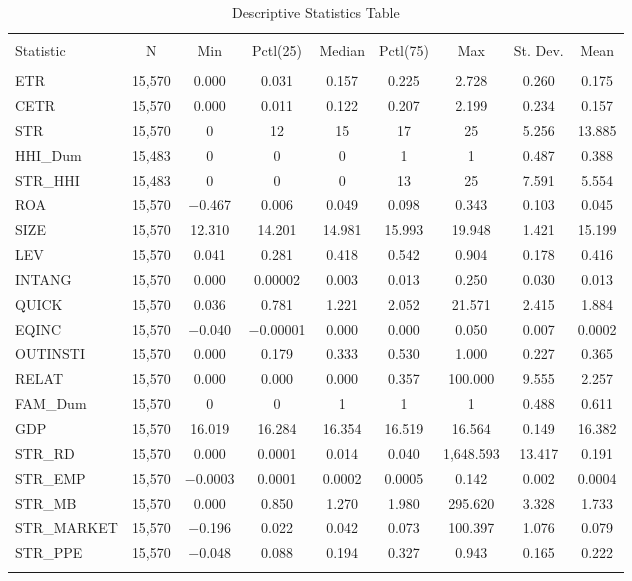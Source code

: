\documentclass[a4paper]{article}\usepackage[]{graphicx}\usepackage[]{color}
\begin{document}
\begin{table}[h!] \centering 
  \caption{Descriptive Statistics Table} 
  \label{D1} 
\begin{tabular}{@{\extracolsep{5pt}}lcccccccc} 
\\[-1.8ex]\hline 
\hline \\[-1.8ex] 
Statistic & \multicolumn{1}{c}{N} & \multicolumn{1}{c}{Min} & \multicolumn{1}{c}{Pctl(25)} & \multicolumn{1}{c}{Median} & \multicolumn{1}{c}{Pctl(75)} & \multicolumn{1}{c}{Max} & \multicolumn{1}{c}{St. Dev.} & \multicolumn{1}{c}{Mean} \\ 
\hline \\[-1.8ex] 
ETR & 15,570 & 0.000 & 0.031 & 0.157 & 0.225 & 2.728 & 0.260 & 0.175 \\ 
CETR & 15,570 & 0.000 & 0.011 & 0.122 & 0.207 & 2.199 & 0.234 & 0.157 \\ 
STR & 15,570 & 0 & 12 & 15 & 17 & 25 & 5.256 & 13.885 \\ 
HHI\_Dum & 15,483 & 0 & 0 & 0 & 1 & 1 & 0.487 & 0.388 \\ 
STR\_HHI & 15,483 & 0 & 0 & 0 & 13 & 25 & 7.591 & 5.554 \\ 
ROA & 15,570 & $-$0.467 & 0.006 & 0.049 & 0.098 & 0.343 & 0.103 & 0.045 \\ 
SIZE & 15,570 & 12.310 & 14.201 & 14.981 & 15.993 & 19.948 & 1.421 & 15.199 \\ 
LEV & 15,570 & 0.041 & 0.281 & 0.418 & 0.542 & 0.904 & 0.178 & 0.416 \\ 
INTANG & 15,570 & 0.000 & 0.00002 & 0.003 & 0.013 & 0.250 & 0.030 & 0.013 \\ 
QUICK & 15,570 & 0.036 & 0.781 & 1.221 & 2.052 & 21.571 & 2.415 & 1.884 \\ 
EQINC & 15,570 & $-$0.040 & $-$0.00001 & 0.000 & 0.000 & 0.050 & 0.007 & 0.0002 \\ 
OUTINSTI & 15,570 & 0.000 & 0.179 & 0.333 & 0.530 & 1.000 & 0.227 & 0.365 \\ 
RELAT & 15,570 & 0.000 & 0.000 & 0.000 & 0.357 & 100.000 & 9.555 & 2.257 \\ 
FAM\_Dum & 15,570 & 0 & 0 & 1 & 1 & 1 & 0.488 & 0.611 \\ 
GDP & 15,570 & 16.019 & 16.284 & 16.354 & 16.519 & 16.564 & 0.149 & 16.382 \\ 
STR\_RD & 15,570 & 0.000 & 0.0001 & 0.014 & 0.040 & 1,648.593 & 13.417 & 0.191 \\ 
STR\_EMP & 15,570 & $-$0.0003 & 0.0001 & 0.0002 & 0.0005 & 0.142 & 0.002 & 0.0004 \\ 
STR\_MB & 15,570 & 0.000 & 0.850 & 1.270 & 1.980 & 295.620 & 3.328 & 1.733 \\ 
STR\_MARKET & 15,570 & $-$0.196 & 0.022 & 0.042 & 0.073 & 100.397 & 1.076 & 0.079 \\ 
STR\_PPE & 15,570 & $-$0.048 & 0.088 & 0.194 & 0.327 & 0.943 & 0.165 & 0.222 \\ 
\hline \\[-1.8ex] 
\end{tabular} 
\end{table} 
\end{document}
